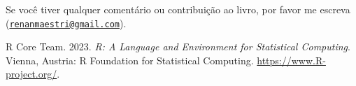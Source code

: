 \documentclass[
]{book}
\newlength{\cslhangindent}
\newenvironment{CSLReferences}[2] %
 {\begin{list}{}{%
  \setlength{\itemindent}{0pt}
  \setlength{\leftmargin}{0pt}
  \setlength{\parsep}{0pt}
  \ifodd #1
   \setlength{\leftmargin}{\cslhangindent}
   \setlength{\itemindent}{-1\cslhangindent}
  \fi
  \setlength{\itemsep}{#2\baselineskip}}}
 {\end{list}}
\begin{document}
Se você tiver qualquer comentário ou contribuição ao livro, por favor me
escreva
(\href{mailto:renanmaestri@gmail.com}{\nolinkurl{renanmaestri@gmail.com}}).

\label{refs}
\begin{CSLReferences}{1}{0}
R Core Team. 2023. \emph{R: A Language and Environment for Statistical
Computing}. Vienna, Austria: R Foundation for Statistical Computing.
\url{https://www.R-project.org/}.

\end{CSLReferences}

\backmatter
\end{document}
